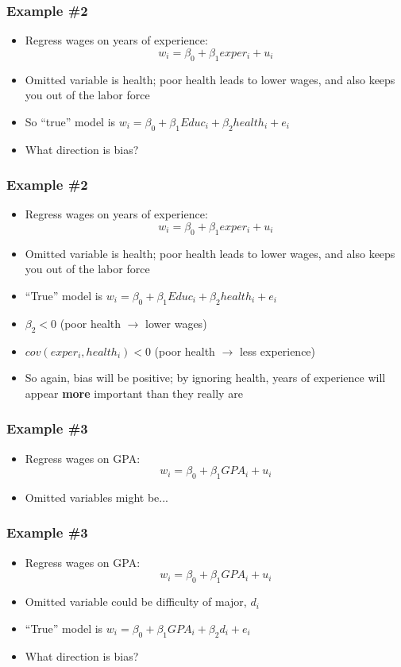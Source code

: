 \documentclass[aspectratio=169]{beamer}
\begin{document}
\begin{frame}
    \frametitle{Example \#2}
    \begin{itemize}
        \item Regress wages on years of experience:
        $$ 
            w_i = \beta_0 + \beta_1 exper_i + u_i
        $$
        \item Omitted variable is health; poor health leads to lower wages, and also keeps you out of the labor force
        \item So ``true'' model is $w_i = \beta_0 + \beta_1 Educ_i + \beta_2 health_i + e_i$
        \item What direction is bias?
    \end{itemize}
\end{frame}

\begin{frame}
    \frametitle{Example \#2}
    \begin{itemize}
        \item Regress wages on years of experience:
        $$ 
            w_i = \beta_0 + \beta_1 exper_i + u_i
        $$
        \item Omitted variable is health; poor health leads to lower wages, and also keeps you out of the labor force
        \item ``True'' model is $w_i = \beta_0 + \beta_1 Educ_i + \beta_2 health_i + e_i$
        \item $\beta_2 < 0$ (poor health $\rightarrow$ lower wages)
        \item $cov(exper_i, health_i) < 0 $ (poor health $\rightarrow$ less experience)
        \item So again, bias will be positive; by ignoring health, years of experience will appear \textbf{more} important than they really are
    \end{itemize}
\end{frame}

\begin{frame}
    \frametitle{Example \#3}
    \begin{itemize}
        \item Regress wages on GPA:
        $$ 
            w_i = \beta_0 + \beta_1 GPA_i + u_i
        $$
        \item Omitted variables might be...
    \end{itemize}
\end{frame}

\begin{frame}
    \frametitle{Example \#3}
    \begin{itemize}
        \item Regress wages on GPA:
        $$ 
            w_i = \beta_0 + \beta_1 GPA_i + u_i
        $$
        \item Omitted variable could be difficulty of major, $d_i$
        \item ``True'' model is $w_i = \beta_0 + \beta_1 GPA_i + \beta_2 d_i + e_i$
        \item What direction is bias?
    \end{itemize}
\end{frame}
\end{document}
